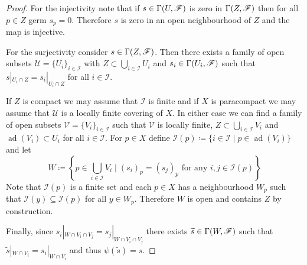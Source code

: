\documentclass[../../main]{subfiles}
\begin{document}
\begin{proof}
  For the injectivity note that if \(s \in \Gamma(U, \mathscr{F})\) is zero in \(\Gamma(Z, \mathscr{F})\) then for all \(p \in Z\) germ \(s_{p} = 0\).
  Therefore \(s\) is zero in an open neighbourhood of \(Z\) and the map is injective.

  For the surjectivity consider \(s \in \Gamma(Z, \mathscr{F})\).
  Then there exists a family of open subsets \(\mathcal{U} = \{U_{i}\}_{i \in \mathcal{I}}\) with \(Z \subset \bigcup_{i \in \mathcal{I}} U_{i}\) and \(s_{i} \in \Gamma(U_{i}, \mathscr{F})\) such that \(s|_{U_{i} \cap Z} = s_{i}|_{U_{i} \cap Z}\) for all \(i \in \mathcal{I}\).

  If \(Z\) is compact we may assume that \(\mathcal{I}\) is finite and if \(X\) is paracompact we may assume that \(\mathcal{U}\) is a locally finite covering of \(X\).
  In either case we can find a family of open subsets \(\mathcal{V} = \{V_{i}\}_{i \in \mathcal{I}}\) such that \(\mathcal{V}\) is locally finite, \(Z \subset \bigcup_{i \in \mathcal{I}} V_{i}\) and \(\operatorname{ad}(V_{i}) \subset U_{i}\) for all \(i \in \mathcal{I}\).
  For \(p \in X\) define \(\mathcal{I}(p) \coloneq \{i \in \mathcal{I} \mid p \in \operatorname{ad}(V_{i})\}\) and let
  \begin{equation*}
    W \coloneq \left\{ p \in \bigcup_{i \in \mathcal{I}} V_{i} \mid (s_{i})_{p} = (s_{j})_{p} \text{ for any } i, j \in \mathcal{I}(p) \right\}
  \end{equation*}
  Note that \(\mathcal{I}(p)\) is a finite set and each \(p \in X\) has a neighbourhood \(W_{p}\) such that \(\mathcal{I}(y) \subseteq \mathcal{I}(p)\) for all \(y \in W_{p}\).
  Therefore \(W\) is open and contains \(Z\) by construction.

  Finally, since \(s_{i}|_{W \cap V_{i} \cap V_{j}} = s_{j}|_{W \cap V_{i} \cap V_{j}}\) there exists \(\widetilde{s} \in \Gamma(W, \mathscr{F})\) such that \(\widetilde{s}|_{W \cap V_{i}} = s_{i}|_{W \cap V_{i}}\) and thus \(\psi(\widetilde{s}) = s\).
\end{proof}
\end{document}
